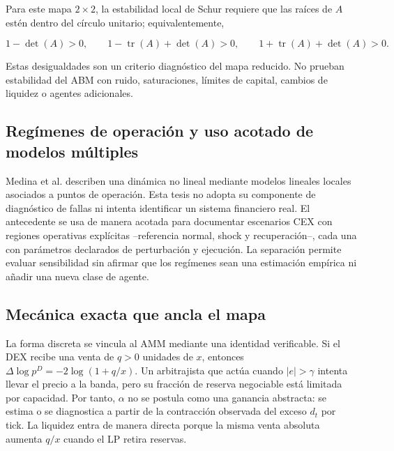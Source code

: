 Para este mapa $2\times2$, la estabilidad local de Schur requiere que las raíces de
$A$ estén dentro del círculo unitario; equivalentemente,

\begin{equation}
  1-\det(A)>0,\qquad
  1-\operatorname{tr}(A)+\det(A)>0,\qquad
  1+\operatorname{tr}(A)+\det(A)>0.
\end{equation}

Estas desigualdades son un criterio diagnóstico del mapa reducido. No prueban
estabilidad del ABM con ruido, saturaciones, límites de capital, cambios de liquidez o
agentes adicionales.

\subsection{Regímenes de operación y uso acotado de modelos múltiples}

Medina et al. \cite{medina2009multimodelos} describen una dinámica no lineal mediante
modelos lineales locales asociados a puntos de operación. Esta tesis no adopta su
componente de diagnóstico de fallas ni intenta identificar un sistema financiero real.
El antecedente se usa de manera acotada para documentar escenarios CEX con regiones
operativas explícitas --referencia normal, shock y recuperación--, cada una con
parámetros declarados de perturbación y ejecución. La separación permite evaluar
sensibilidad sin afirmar que los regímenes sean una estimación empírica ni añadir una
nueva clase de agente.

\subsection{Mecánica exacta que ancla el mapa}

La forma discreta se vincula al AMM mediante una identidad verificable. Si el DEX recibe
una venta de $q>0$ unidades de $x$, entonces
$\Delta\log p^D=-2\log(1+q/x)$. Un arbitrajista que actúa cuando $|e|>\gamma$ intenta
llevar el precio a la banda, pero su fracción de reserva negociable está limitada por
capacidad. Por tanto, $\alpha$ no se postula como una ganancia abstracta: se estima o
se diagnostica a partir de la contracción observada del exceso $d_t$ por tick. La
liquidez entra de manera directa porque la misma venta absoluta aumenta $q/x$ cuando
el LP retira reservas.
